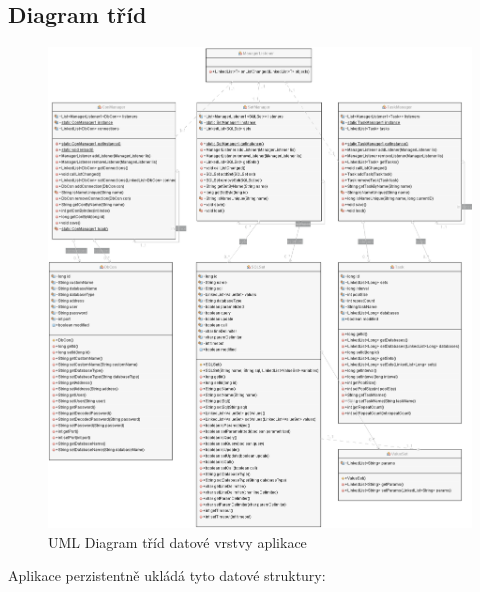 \documentclass[czech,bachelor,public,dept460,male,cpdeclaration,twoside]{diploma}
\begin{document}
\subsection{Diagram tříd} \label{datadiagram}
\begin{figure}[!htbp]\centering\includegraphics[width=1.0\textwidth]{Figures/DataLayerDiagram.png}\caption{UML Diagram tříd datové vrstvy aplikace}
\end{figure}
\newpage
Aplikace perzistentně ukládá tyto datové struktury:
\end{document}

